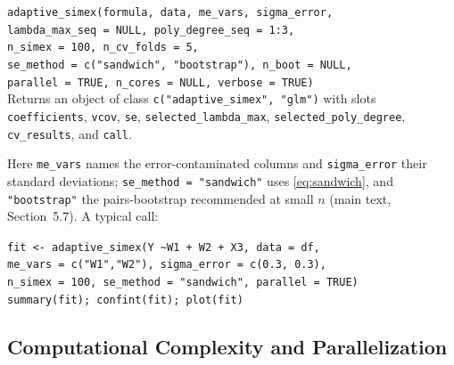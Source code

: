 \begin{center}
\small
\begin{minipage}{0.93\textwidth}
\texttt{adaptive\_simex(formula, data, me\_vars, sigma\_error,\\
\quad lambda\_max\_seq = NULL, poly\_degree\_seq = 1:3,\\
\quad n\_simex = 100, n\_cv\_folds = 5,\\
\quad se\_method = c("sandwich", "bootstrap"), n\_boot = NULL,\\
\quad parallel = TRUE, n\_cores = NULL, verbose = TRUE)}\\
Returns an object of class \texttt{c("adaptive\_simex", "glm")} with
slots \texttt{coefficients}, \texttt{vcov}, \texttt{se},
\texttt{selected\_lambda\_max}, \texttt{selected\_poly\_degree},
\texttt{cv\_results}, and \texttt{call}.
\end{minipage}
\end{center}

\noindent Here \texttt{me\_vars} names the error-contaminated columns
and \texttt{sigma\_error} their standard deviations;
\texttt{se\_method = "sandwich"} uses \eqref{eq:sandwich}, and
\texttt{"bootstrap"} the pairs-bootstrap recommended at small $n$
(main text, Section~5.7). A typical call:

\begin{center}
\small
\begin{minipage}{0.93\textwidth}
\texttt{fit <- adaptive\_simex(Y \textasciitilde W1 + W2 + X3, data = df,\\
\quad me\_vars = c("W1","W2"), sigma\_error = c(0.3, 0.3),\\
\quad n\_simex = 100, se\_method = "sandwich", parallel = TRUE)}\\
\texttt{summary(fit); confint(fit); plot(fit)}
\end{minipage}
\end{center}

\subsection*{Computational Complexity and Parallelization}\label{sec:complexity}



